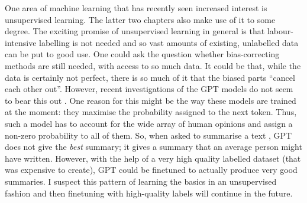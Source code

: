 One area of machine learning that has recently seen increased interest is unsupervised learning.
The latter two chapters also make use of it to some degree.
The exciting promise of unsupervised learning in general is
that labour-intensive labelling is not needed and so vast amounts of existing, unlabelled data can be put to good use.
One could ask the question whether bias-correcting methods are still needed, with access to so much data.
It could be that, while the data is certainly not perfect,
there is so much of it that the biased parts ``cancel each other out''.
However, recent investigations of the GPT models do not seem to bear this out \citep{khalifa2021distributional}.
One reason for this might be the way these models are trained at the moment:
they maximise the probability assigned to the next token.
Thus, such a model has to account for the wide array of human opinions and assign a non-zero probability to all of them.
So, when asked to summarise a text \citep{stiennon2020learning}, GPT does not give the \emph{best} summary;
it gives a summary that an average person might have written.
However, with the help of a very high quality labelled dataset (that was expensive to create),
GPT could be finetuned to actually produce very good summaries.
I suspect this pattern of learning the basics in an unsupervised fashion
and then finetuning with high-quality labels will continue in the future.
